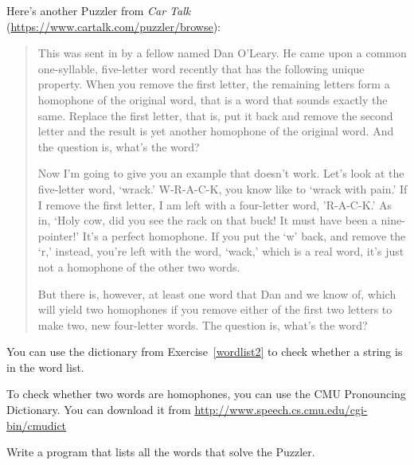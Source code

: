 \documentclass[10pt]{book}
\begin{document}
\begin{exercise}

Here's another Puzzler from {\em Car Talk} 
(\url{https://www.cartalk.com/puzzler/browse}):

\begin{quote}
This was sent in by a fellow named Dan O'Leary. He came upon a common
one-syllable, five-letter word recently that has the following unique
property. When you remove the first letter, the remaining letters form
a homophone of the original word, that is a word that sounds exactly
the same. Replace the first letter, that is, put it back and remove
the second letter and the result is yet another homophone of the
original word. And the question is, what's the word?

Now I'm going to give you an example that doesn't work. Let's look at
the five-letter word, `wrack.' W-R-A-C-K, you know like to `wrack with
pain.' If I remove the first letter, I am left with a four-letter
word, 'R-A-C-K.' As in, `Holy cow, did you see the rack on that buck!
It must have been a nine-pointer!' It's a perfect homophone. If you
put the `w' back, and remove the `r,' instead, you're left with the
word, `wack,' which is a real word, it's just not a homophone of the
other two words.

But there is, however, at least one word that Dan and we know of,
which will yield two homophones if you remove either of the first two
letters to make two, new four-letter words. The question is, what's
the word?
\end{quote}

You can use the dictionary from Exercise~\ref{wordlist2} to check
whether a string is in the word list.

To check whether two words are homophones, you can use the CMU
Pronouncing Dictionary.  You can download it from
\url{http://www.speech.cs.cmu.edu/cgi-bin/cmudict}

Write a program that lists all the words that solve the Puzzler.

\end{exercise}
\end{document}

